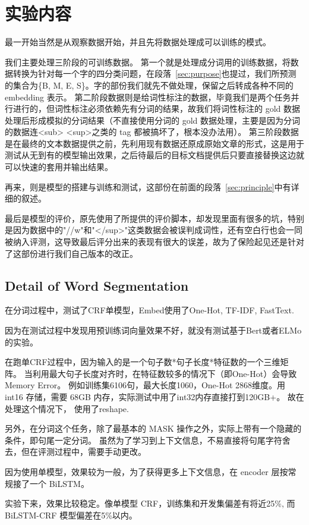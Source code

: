 \section{实验内容}
\label{sec:experiment}

最一开始当然是从观察数据开始，并且先将数据处理成可以训练的模式。

我们主要处理三阶段的可训练数据。
第一个就是处理成分词用的训练数据，将数据转换为针对每一个字的四分类问题，在段落~\ref{sec:purpose}也提过，我们所预测的集合为\{B, M, E, S\}。字的部份我们就先不做处理，保留之后转成各种不同的 embedding 表示。
第二阶段数据则是给词性标注的数据，毕竟我们是两个任务并行进行的，但词性标注必须依赖先有分词的结果，故我们将词性标注的 gold 数据处理后形成模拟的分词结果（不直接使用分词的 gold 数据处理，主要是因为分词的数据连<sub> <sup>之类的 tag 都被搞坏了，根本没办法用）。
第三阶段数据是在最终的文本数据提供之前，先利用现有数据还原成原始文章的形式，这是用于测试从无到有的模型输出效果，之后待最后的目标文档提供后只要直接替换这边就可以快速的套用并输出结果。

再来，则是模型的搭建与训练和测试，这部份在前面的段落~\ref{sec:principle}中有详细的叙述。

最后是模型的评价，原先使用了所提供的评价脚本，却发现里面有很多的坑，特别是因为数据中的"//w"和"</sup>"这类数据会被误判成词性，还有空白行也会一同被纳入评测，这导致最后评分出来的表现有很大的误差，故为了保险起见还是针对了这部份进行我们自己版本的改正。

\subsection*{Detail of Word Segmentation}

在分词过程中，测试了CRF单模型，Embed使用了One-Hot, TF-IDF, FastText.

因为在测试过程中发现用预训练词向量效果不好，就没有测试基于Bert或者ELMo的实验。

在跑单CRF过程中，因为输入的是一个句子数*句子长度*特征数的一个三维矩阵。
当利用最大句子长度对齐时，在特征数较多的情况下（即One-Hot）会导致Memory Error。
例如训练集6106句，最大长度1060，One-Hot 2868维度。用 int16 存储，需要 68GB 内存，实际测试中用了int32内存直接打到120GB+。
故在处理这个情况下， 使用了reshape.

另外，在分词这个任务，除了最基本的 MASK 操作之外，实际上带有一个隐藏的条件，即句尾一定分词。
虽然为了学习到上下文信息，不易直接将句尾字符舍去，但在评测过程中，需要手动更改。

因为使用单模型，效果较为一般，为了获得更多上下文信息，在 encoder 层按常规接了一个 BiLSTM。

实验下来，效果比较稳定。像单模型 CRF，训练集和开发集偏差有将近25\%, 而 BiLSTM-CRF 模型偏差在5\%以内。